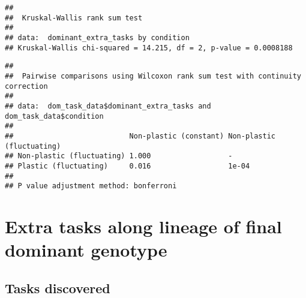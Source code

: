 \documentclass[]{book}
\newenvironment{Shaded}{\begin{snugshade}}{\end{snugshade}}
\newcommand{\DataTypeTok}[1]{\textcolor[rgb]{0.13,0.29,0.53}{#1}}
\newcommand{\FloatTok}[1]{\textcolor[rgb]{0.00,0.00,0.81}{#1}}
\newcommand{\KeywordTok}[1]{\textcolor[rgb]{0.13,0.29,0.53}{\textbf{#1}}}
\newcommand{\NormalTok}[1]{#1}
\newcommand{\OperatorTok}[1]{\textcolor[rgb]{0.81,0.36,0.00}{\textbf{#1}}}
\newcommand{\OtherTok}[1]{\textcolor[rgb]{0.56,0.35,0.01}{#1}}
\newcommand{\StringTok}[1]{\textcolor[rgb]{0.31,0.60,0.02}{#1}}
\begin{document}
\begin{verbatim}
## 
##  Kruskal-Wallis rank sum test
## 
## data:  dominant_extra_tasks by condition
## Kruskal-Wallis chi-squared = 14.215, df = 2, p-value = 0.0008188
\end{verbatim}

\begin{Shaded}
\end{Shaded}

\begin{verbatim}
## 
##  Pairwise comparisons using Wilcoxon rank sum test with continuity correction 
## 
## data:  dom_task_data$dominant_extra_tasks and dom_task_data$condition 
## 
##                           Non-plastic (constant) Non-plastic (fluctuating)
## Non-plastic (fluctuating) 1.000                  -                        
## Plastic (fluctuating)     0.016                  1e-04                    
## 
## P value adjustment method: bonferroni
\end{verbatim}

\hypertarget{extra-tasks-along-lineage-of-final-dominant-genotype}{%
\section{Extra tasks along lineage of final dominant genotype}\label{extra-tasks-along-lineage-of-final-dominant-genotype}}

\hypertarget{tasks-discovered}{%
\subsection{Tasks discovered}\label{tasks-discovered}}
\end{document}
